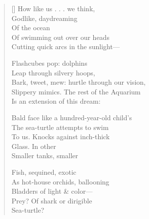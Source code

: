 \label{ch:dolphins}
\settowidth{\versewidth}{Bark, tweet, mew: hurtle through our vision,}
\begin{verse}[\versewidth]
How like us . . .  we think,\\
Godlike, daydreaming\\
Of the ocean\\
Of swimming out over our heads\\
Cutting quick arcs in the sunlight---

Flashcubes pop: dolphins\\
Leap through silvery hoops,\\
Bark, tweet, mew: hurtle through our vision,\\
Slippery mimics. The rest of the Aquarium\\
Is an extension of this dream:

Bald face like a hundred-year-old child's\\
The sea-turtle attempts to swim\\
To us. Knocks against inch-thick\\
Glass.     In other\\
Smaller tanks, smaller

Fish, sequined, exotic\\
As hot-house orchids, ballooning\\
Bladders of light \& color---\\
Prey? Of shark or dirigible\\
Sea-turtle?
\end{verse}
